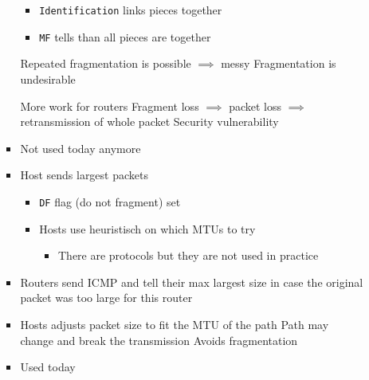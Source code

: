 \begin{itemize}
\begin{itemize}
\begin{itemize}
                        \begin{itemize}
                            \item \verb+Identification+ links pieces together
                            \item \verb+MF+ tells than all pieces are together
                        \end{itemize}
                    \icon Repeated fragmentation is possible $\implies$ messy
                    \icon Fragmentation is undesirable
                        \begin{itemize}
                            \icon More work for routers
                            \icon Fragment loss $\implies$ packet loss $\implies$ retransmission of whole packet
                            \icon Security vulnerability
                        \end{itemize}
                    \item Not used today anymore
                \end{itemize}
                \begin{itemize}
                    \item Host sends largest packets
                        \begin{itemize}
                            \item \verb+DF+ flag (do not fragment) set
                            \item Hosts use heuristisch on which MTUs to try
                                \begin{itemize}
                                    \item There are protocols but they are not used in practice
                                \end{itemize}
                        \end{itemize}
                    \item Routers send ICMP and tell their max largest size in case the original packet was too large for this router
                    \item Hosts adjusts packet size to fit the MTU of the path
                    \icon Path may change and break the transmission
                    \ipro Avoids fragmentation
                    \item Used today
                \end{itemize}
        \end{itemize}
\end{itemize}

